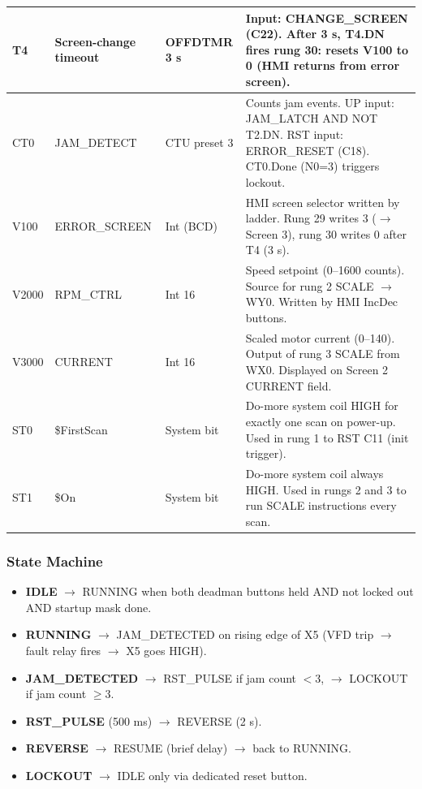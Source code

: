 \documentclass[hidelinks,12pt]{article}
\begin{document}
\begin{xltabular}{\textwidth}{|l|l|l|X|}
T4 & Screen-change timeout & OFFDTMR 3 s & Input: CHANGE\_SCREEN (C22). After 3 s, T4.DN fires rung 30: resets V100 to 0 (HMI returns from error screen). \\ \hline
CT0 & JAM\_DETECT & CTU preset 3 & Counts jam events. UP input: JAM\_LATCH AND NOT T2.DN. RST input: ERROR\_RESET (C18). CT0.Done (N0=3) triggers lockout. \\ \hline
V100 & ERROR\_SCREEN & Int (BCD) & HMI screen selector written by ladder. Rung 29 writes 3 ($\rightarrow$ Screen 3), rung 30 writes 0 after T4 (3 s). \\ \hline
V2000 & RPM\_CTRL & Int 16 & Speed setpoint (0--1600 counts). Source for rung 2 SCALE $\rightarrow$ WY0. Written by HMI IncDec buttons. \\ \hline
V3000 & CURRENT & Int 16 & Scaled motor current (0--140). Output of rung 3 SCALE from WX0. Displayed on Screen 2 CURRENT field. \\ \hline
ST0 & \$FirstScan & System bit & Do-more system coil HIGH for exactly one scan on power-up. Used in rung 1 to RST C11 (init trigger). \\ \hline
ST1 & \$On & System bit & Do-more system coil always HIGH. Used in rungs 2 and 3 to run SCALE instructions every scan. \\ \hline
\end{xltabular}

\subsubsection{State Machine}

\begin{itemize}
    \item \textbf{IDLE} $\rightarrow$ RUNNING when both deadman buttons held AND not locked out AND startup mask done.
    \item \textbf{RUNNING} $\rightarrow$ JAM\_DETECTED on rising edge of X5 (VFD trip $\rightarrow$ fault relay fires $\rightarrow$ X5 goes HIGH).
    \item \textbf{JAM\_DETECTED} $\rightarrow$ RST\_PULSE if jam count $< 3$, $\rightarrow$ LOCKOUT if jam count $\geq 3$.
    \item \textbf{RST\_PULSE} (500 ms) $\rightarrow$ REVERSE (2 s).
    \item \textbf{REVERSE} $\rightarrow$ RESUME (brief delay) $\rightarrow$ back to RUNNING.
    \item \textbf{LOCKOUT} $\rightarrow$ IDLE only via dedicated reset button.
\end{itemize}
\end{document}
